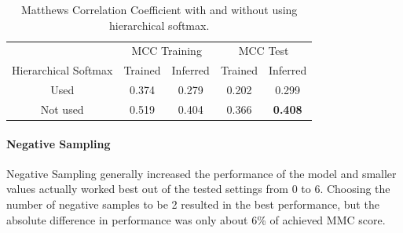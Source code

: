 \begin{table}[h]
  \begin{center}
    \begin{tabular}{ c | *2c | *2c }
      \toprule
       & \multicolumn{2}{c|}{MCC Training} & \multicolumn{2}{|c}{MCC Test}\\
      Hierarchical Softmax & Trained & Inferred & Trained & Inferred \\
      \midrule
      Used & 0.374 & 0.279 & 0.202 & 0.299 \\
      Not used & 0.519 & 0.404 & 0.366 & \textbf{0.408} \\
    \bottomrule
  \end{tabular}
  \caption{Matthews Correlation Coefficient with and without using hierarchical softmax.}
\label{tab:Paragraph Vector Parameter Results Hierarchical Softmax}
\end{center}
\end{table}

\paragraph{Negative Sampling}
Negative Sampling generally increased the performance of the model and smaller values actually worked best out of the tested settings from 0 to 6. Choosing the number of negative samples to be 2 resulted in the best performance, but the absolute difference in performance was only about 6\% of achieved MMC score.

